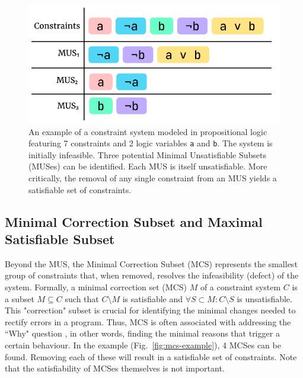 \begin{figure}[hbt]
  \centering
  \includegraphics[width=0.8\linewidth]{MUS}
  \caption[An illustration of Minimal Unsatisfiable Subsets (MUSes)]{
    \label{fig:mus-example}
    An example of a constraint system modeled in propositional logic featuring 7 constraints and 2 logic variables \texttt{a} and \texttt{b}. The system is initially infeasible.  Three potential Minimal Unsatisfiable Subsets (MUSes) can be identified. Each MUS is itself unsatisfiable. More critically, the removal of any single constraint from an MUS yields a satisfiable set of constraints. }
\end{figure}

\subsection*{Minimal Correction Subset and Maximal Satisfiable Subset}

Beyond the MUS, the Minimal Correction Subset (MCS) represents the smallest group of constraints that, when removed, resolves the infeasibility (defect) of the system. Formally, a minimal correction set (MCS) $M$ of a constraint system $C$ is a subset $M \subseteq C$ such that $C \setminus M$ is satisfiable and $\forall{S} \subset M : C \setminus S$ is unsatisfiable. This "correction" subset is crucial for identifying the minimal changes needed to rectify errors in a program. Thus, MCS is often associated with addressing the ``Why" question \cite{Ignatiev2020-xu, Nelson2017-ar}, in other words, finding the minimal reasons that trigger a certain behaviour. In the example (Fig.~\ref{fig:mcs-example}), 4 MCSes can be found. Removing each of these will result in a satisfiable set of constraints. Note that the satisfiability of MCSes themselves is not important.  


